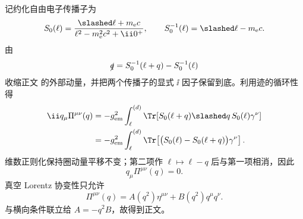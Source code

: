 \begin{derivation}
记约化自由电子传播子为
\begin{equation*}
 S_0(\ell)=\frac{\slashed\ell+m_{\mathrm e} c}{\ell^2-m_{\mathrm e}^2c^2+\ii0^+},
 \qquad
 S_{0}^{-1}(\ell)=\slashed\ell-m_{\mathrm e} c .
\end{equation*}
由
\begin{equation*}
 \slashed q=S_0^{-1}(\ell+q)-S_0^{-1}(\ell)
\end{equation*}
收缩正文 的外部动量，并把两个传播子的显式 $\ii$ 因子保留到底。利用迹的循环性得
\begin{align*}
 \ii q_\mu\Pi^{\mu\nu}(q)
 &=-g_{\rm em}^2
 \int_\ell^{(d)}
 \Tr\!\left[
 S_0(\ell+q)\slashed q\,S_0(\ell)\gamma^\nu
 \right]\\
 &=-g_{\rm em}^2
 \int_\ell^{(d)}
 \Tr\!\left[
 \bigl(S_0(\ell)-S_0(\ell+q)\bigr)\gamma^\nu
 \right].
\end{align*}
维数正则化保持圈动量平移不变；第二项作 \(\ell\mapsto\ell-q\) 后与第一项相消，因此
\begin{equation*}
 q_\mu\Pi^{\mu\nu}(q)=0.
\end{equation*}
真空 Lorentz 协变性只允许
\begin{equation*}
 \Pi^{\mu\nu}(q)=A(q^2)\eta^{\mu\nu}+B(q^2)q^\mu q^\nu .
\end{equation*}
与横向条件联立给 \(A=-q^2B\)，故得到正文。
\end{derivation}

